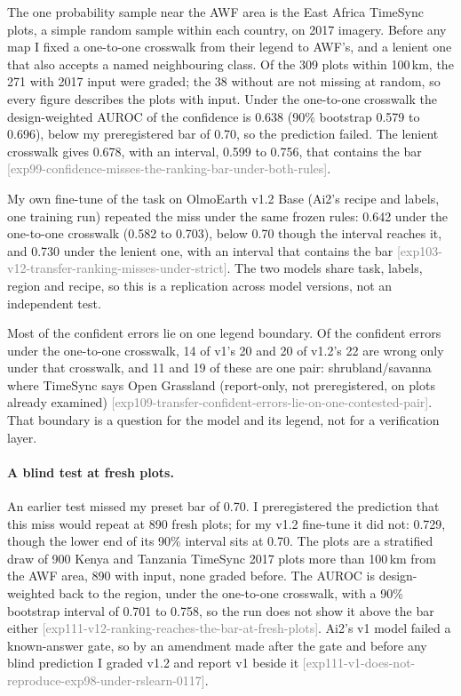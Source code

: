 \documentclass[11pt,a4paper]{article}
\newcommand{\claim}[1]{{\scriptsize\textsf{\textcolor{gray}{[#1]}}}}
\begin{document}
The one probability sample near the AWF area is the East Africa TimeSync plots, a simple random sample within each
country, on 2017 imagery. Before any map I fixed a one-to-one crosswalk from their legend to AWF's, and a lenient one
that also accepts a named neighbouring class. Of the 309 plots within 100\,km, the 271 with 2017 input were graded;
the 38 without are not missing at random, so every figure describes the plots with input. Under the one-to-one
crosswalk the design-weighted AUROC of the confidence is 0.638 (90\% bootstrap 0.579 to 0.696), below my
preregistered bar of 0.70, so the prediction failed. The lenient crosswalk gives 0.678, with an interval, 0.599 to
0.756, that contains the bar \claim{exp99-confidence-misses-the-ranking-bar-under-both-rules}.

My own fine-tune of the task on OlmoEarth v1.2 Base (Ai2's recipe and labels, one training run) repeated the miss
under the same frozen rules: 0.642 under the one-to-one crosswalk (0.582 to 0.703), below 0.70 though the interval
reaches it, and 0.730 under the lenient one, with an interval that contains the bar
\claim{exp103-v12-transfer-ranking-misses-under-strict}. The two models share task, labels, region and recipe, so
this is a replication across model versions, not an independent test.

Most of the confident errors lie on one legend boundary. Of the confident errors under the one-to-one crosswalk, 14
of v1's 20 and 20 of v1.2's 22 are wrong only under that crosswalk, and 11 and 19 of these are one pair:
shrubland/savanna where TimeSync says Open Grassland (report-only, not preregistered, on plots already examined)
\claim{exp109-transfer-confident-errors-lie-on-one-contested-pair}. That boundary is a question for the model and its
legend, not for a verification layer.

\paragraph{A blind test at fresh plots.}
\label{sec:res-blind}
An earlier test missed my preset bar of 0.70. I preregistered the prediction that this miss would repeat at 890 fresh
plots; for my v1.2 fine-tune it did not: 0.729, though the lower end of its 90\% interval sits at 0.70. The plots are
a stratified draw of 900 Kenya and Tanzania TimeSync 2017 plots more than 100\,km from the AWF area, 890 with input,
none graded before. The AUROC is design-weighted back to the region, under the one-to-one crosswalk, with a 90\%
bootstrap interval of 0.701 to 0.758, so the run does not show it above the bar either
\claim{exp111-v12-ranking-reaches-the-bar-at-fresh-plots}. Ai2's v1 model failed a known-answer gate, so by an
amendment made after the gate and before any blind prediction I graded v1.2 and report v1 beside it
\claim{exp111-v1-does-not-reproduce-exp98-under-rslearn-0117}.
\end{document}

